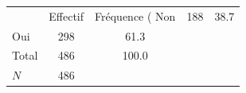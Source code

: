{
\def\sym#1{\ifmmode^{#1}\else\(^{#1}\)\fi}
\begin{tabular}{l*{1}{cc}}
\toprule
            &    Effectif&Fréquence (%
\midrule
Non         &         188&        38.7\\
Oui         &         298&        61.3\\
Total       &         486&       100.0\\
\midrule
\(N\)       &         486&            \\
\bottomrule
\end{tabular}
}

